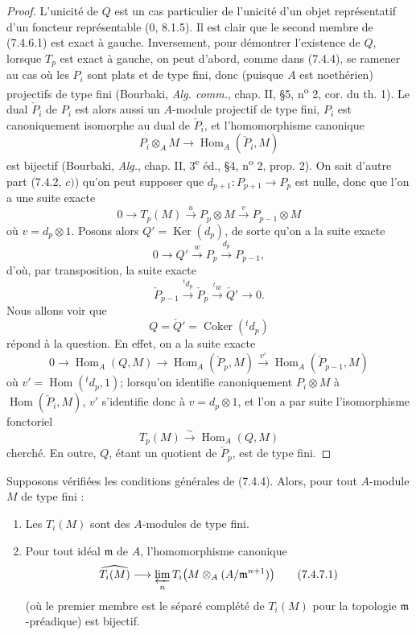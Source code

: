 \begin{proof}
L'unicité de $Q$ est un cas particulier de l'unicité d'un objet représentatif
d'un foncteur représentable (0, 8.1.5). Il est clair que le second membre de
(7.4.6.1) est exact à gauche. Inversement, pour démontrer l'existence de $Q$,
lorsque $T_p$ est exact à gauche, on peut d'abord, comme dans (7.4.4), se
ramener au cas où les $P_i$ sont plats et de type fini, donc (puisque $A$ est
noethérien) projectifs de type fini (Bourbaki, \emph{Alg. comm.}, chap. II,
\S 5, n\textsuperscript{o} 2, cor. du th. 1). Le dual $\check P_i$ de $P_i$
est alors aussi un $A$-module projectif de type fini, $P_i$ est canoniquement
isomorphe au dual de $\check P_i$, et l'homomorphisme canonique
\[
  P_i\otimes_A M\longrightarrow\operatorname{Hom}_A(\check P_i,M)
\]
est bijectif (Bourbaki, \emph{Alg.}, chap. II, 3\textsuperscript{e} éd.,
\S 4, n\textsuperscript{o} 2, prop. 2). On sait d'autre part (7.4.2, $c)$)
qu'on peut supposer que $d_{p+1}:P_{p+1}\to P_p$ est nulle, donc que l'on a une
suite exacte
\[
  0\longrightarrow T_p(M)\xrightarrow{u}P_p\otimes M
  \xrightarrow{v}P_{p-1}\otimes M
\]
où $v=d_p\otimes1$. Posons alors $Q'=\operatorname{Ker}(d_p)$, de sorte qu'on
a la suite exacte
\[
  0\longrightarrow Q'\xrightarrow{w}P_p\xrightarrow{d_p}P_{p-1},
\]
d'où, par transposition, la suite exacte
\[
  \check P_{p-1}\xrightarrow{{}^t d_p}\check P_p
  \xrightarrow{{}^t w}\check Q'\longrightarrow0.
\]
Nous allons voir que
\[
  Q=\check Q'=\operatorname{Coker}({}^t d_p)
\]
répond à la question. En effet, on a la suite exacte
\[
  0\longrightarrow\operatorname{Hom}_A(Q,M)
  \longrightarrow\operatorname{Hom}_A(\check P_p,M)
  \xrightarrow{v'}\operatorname{Hom}_A(\check P_{p-1},M)
\]
où $v'=\operatorname{Hom}({}^t d_p,1)$; lorsqu'on identifie canoniquement
$P_i\otimes M$ à $\operatorname{Hom}(\check P_i,M)$, $v'$ s'identifie donc à
$v=d_p\otimes1$, et l'on a par suite l'isomorphisme fonctoriel
\[
  T_p(M)\xrightarrow{\sim}\operatorname{Hom}_A(Q,M)
\]
cherché. En outre, $Q$, étant un quotient de $\check P_p$, est de type fini.
\end{proof}

\begin{proposition}[7.4.7]
Supposons vérifiées les conditions générales de (7.4.4). Alors, pour tout
$A$-module $M$ de type fini :
\begin{enumerate}
  \item[(i)] Les $T_i(M)$ sont des $A$-modules de type fini.
  \item[(ii)] Pour tout idéal $\mathfrak m$ de $A$, l'homomorphisme canonique
    \[
      \widehat{T_i(M)}
      \longrightarrow
      \varprojlim_n T_i\bigl(M\otimes_A(A/\mathfrak m^{n+1})\bigr)
      \tag{7.4.7.1}\label{III.7.4.7.1.fr}
    \]
    (où le premier membre est le séparé complété de $T_i(M)$ pour la topologie
    $\mathfrak m$-préadique) est bijectif.
\end{enumerate}
\end{proposition}

